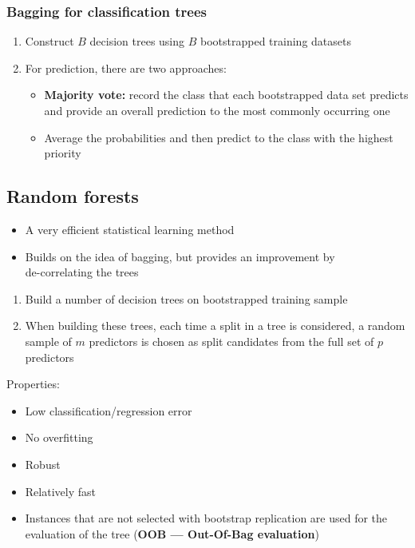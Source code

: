 \documentclass{article}
\begin{document}
            \subsubsection{Bagging for classification trees}
            \begin{enumerate}
                \item Construct $B$ decision trees using $B$ bootstrapped training datasets
                \item For prediction, there are two approaches:
                \begin{itemize}
                    \item \textbf{Majority vote:} record the class that each bootstrapped data set predicts and provide an overall prediction to the most commonly occurring one
                    \item Average the probabilities and then predict to the class with the highest priority
                \end{itemize}
            \end{enumerate}

        \subsection{Random forests}
        \begin{itemize}
            \item A very efficient statistical learning method
            \item Builds on the idea of bagging, but provides an improvement by \\ de-correlating the trees
        \end{itemize}

        \begin{enumerate}
            \item Build a number of decision trees on bootstrapped training sample
            \item When building these trees, each time a split in a tree is considered, a random sample of $m$ predictors is chosen as split candidates from the full set of $p$ predictors
        \end{enumerate}

        Properties:
        \begin{itemize}
            \item Low classification/regression error
            \item No overfitting
            \item Robust
            \item Relatively fast
            \item Instances that are not selected with bootstrap replication are used for the evaluation of the tree (\textbf{OOB --- Out-Of-Bag evaluation})
        \end{itemize}
\end{document}
